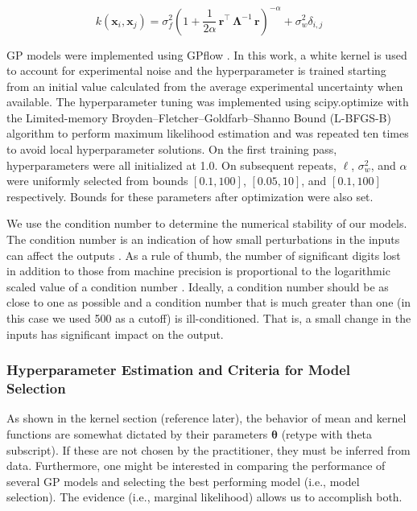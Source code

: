 \documentclass[journal=jacsat,manuscript=article]{achemso}
\newcommand{\kjtodo}[1]{{\color{red} (#1)}}
\newcommand{\xvec}{\ensuremath{\mathbf{x}}}
\begin{document}
{\begin{equation}
    k(\xvec_i,\xvec_j) = \sigma_f^2 \left(1 +\frac{1}{2 \alpha} \,\mathbf{r}^\intercal \,\boldsymbol{\Lambda}^{-1} \,\mathbf{r} \right)^{-\alpha} + \sigma_w^2\delta_{i,j} 
    \label{kernel_final}
\end{equation} 

GP models were implemented using GPflow \cite{Matthews2017GPflow:TensorFlow}. In this work, a white kernel is used to account for experimental noise and the hyperparameter is trained starting from an initial value calculated from the average experimental uncertainty when available. The hyperparameter tuning was implemented using scipy.optimize \cite{Virtanen2020SciPyPython} with the Limited-memory Broyden–Fletcher–Goldfarb–Shanno Bound (L-BFGS-B) algorithm to perform maximum likelihood estimation and was repeated ten times to avoid local hyperparameter solutions. On the first training pass, hyperparameters were all initialized at 1.0. On subsequent repeats, $\ell$, $\sigma^2_w$, and $\alpha$ were uniformly selected from bounds $[0.1, 100]$, $[0.05, 10]$, and $[0.1, 100]$  respectively. Bounds for these parameters after optimization were also set.

We use the condition number to determine the numerical stability of our models. The condition number is an indication of how small perturbations in the inputs can affect the outputs \cite{Foster2009}. As a rule of thumb, the number of significant digits lost in addition to those from machine precision is proportional to the logarithmic scaled value of a condition number \cite{NumMathComput}. Ideally, a condition number should be as close to one as possible and a condition number that is much greater than one (in this case we used 500 as a cutoff) is ill-conditioned. That is, a small change in the inputs has significant impact on the output.

\subsubsection{Hyperparameter Estimation and Criteria for Model Selection}
As shown in the kernel section \kjtodo{reference later}, the behavior of mean and kernel functions are somewhat dictated by their parameters $\boldsymbol{\theta}$ \kjtodo{retype with theta subscript}. If these are not chosen by the practitioner, they must be inferred from data. Furthermore, one might be interested in comparing the performance of several GP models and selecting the best performing model (i.e., model selection). The evidence (i.e., marginal likelihood) allows us to accomplish both.

}
\end{document}
